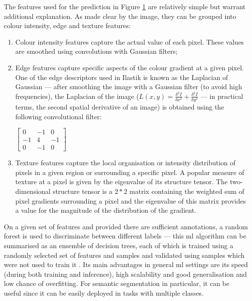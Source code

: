 \begin{figure}[!ht]
	\label{fig:segmentation-example}
\end{figure}

The features used for the prediction in Figure \ref{fig:segmentation-example} are relatively simple but warrant additional explanation. As made clear by the image, they can be grouped into colour intensity, edge and texture features:

\begin{enumerate}
	\item Colour intensity features capture the actual value of each pixel. These values are smoothed using convolutions with Gaussian filters;
	\item Edge features capture specific aspects of the colour gradient at a given pixel. One of the edge descriptors used in Ilastik is known as the Laplacian of Gaussian --- after smoothing the image with a Gaussian filter (to avoid high frequencies), the Laplacian of the image ($L(x,y) = \frac{\delta^2I}{\delta x^2} + \frac{\delta^2I}{\delta y^2}$ --- in practical terms, the second spatial derivative of an image) is obtained using the following convolutional filter:
	
			\begin{center}
				$\begin{bmatrix}0 & -1 & 0\\-1 & 4 & -1\\0 & -1 & 0\end{bmatrix}$
			\end{center}
	
	\item Texture features capture the local organisation or intensity distribution of pixels in a given region or surrounding a specific pixel. A popular measure of texture at a pixel is given by the eigenvalue of its structure tensor. The two-dimensional structure tensor is a $2*2$ matrix containing the weighted sum of pixel gradients surrounding a pixel and the eigenvalue of this matrix provides a value for the magnitude of the distribution of the gradient.
\end{enumerate}

On a given set of features and provided there are sufficient annotations, a random forest is used to discriminate between different labels --- this \ac{ml} algorithm can be summarised as an ensemble of decision trees, each of which is trained using a randomly selected set of features and samples and validated using samples which were not used to train it \cite{Breiman2001-yz}. Its main advantages in general \ac{ml} settings are its speed (during both training and inference), high scalability and good generalisation and low chance of overfitting. For semantic segmentation in particular, it can be useful since it can be easily deployed in tasks with multiple classes.

